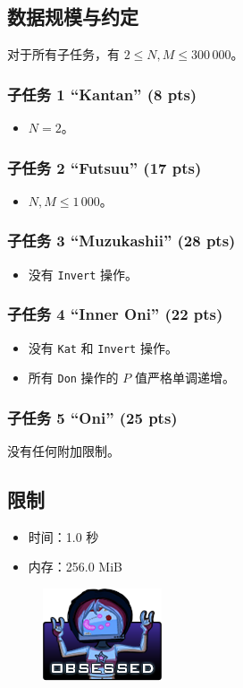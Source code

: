 \documentclass[UTF8, 11pt, a4paper]{article}
\begin{document}
\subsection*{数据规模与约定}
对于所有子任务，有 $2 \leq N, M \leq 300\,000$。
\subsubsection*{子任务 1 “Kantan” (8 pts)}
\begin{itemize}
    \item $N = 2$。
\end{itemize}
\subsubsection*{子任务 2 “Futsuu” (17 pts)}
\begin{itemize}
    \item $N, M \leq 1\,000$。
\end{itemize}
\subsubsection*{子任务 3 “Muzukashii” (28 pts)}
\begin{itemize}
    \item 没有 \texttt{Invert} 操作。
\end{itemize}
\subsubsection*{子任务 4 “Inner Oni” (22 pts)}
\begin{itemize}
    \item 没有 \texttt{Kat} 和 \texttt{Invert} 操作。
    \item 所有 \texttt{Don} 操作的 $P$ 值严格单调递增。
\end{itemize}
\subsubsection*{子任务 5 “Oni” (25 pts)}
    没有任何附加限制。

\subsection*{限制}
\begin{itemize}
\item 时间：1.0 秒
\item 内存：256.0 MiB
\end{itemize}

\begin{figure}[h]\centering
\includegraphics[scale=0.55]{obsessed.png}
\end{figure}
\end{document}
